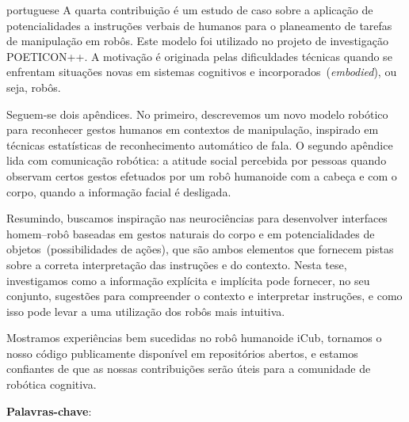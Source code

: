 \begin{otherlanguage*}{portuguese}
A quarta contribuição é um estudo de caso sobre a aplicação de potencialidades a instruções verbais de humanos para o planeamento de tarefas de manipulação em robôs.
Este modelo foi utilizado no projeto de investigação POETICON++.
A motivação é originada pelas dificuldades técnicas quando se enfrentam situações novas em sistemas cognitivos e incorporados~(\emph{embodied}), ou seja, robôs.

Seguem-se dois apêndices.
No primeiro, descrevemos um novo modelo robótico para reconhecer gestos humanos em contextos de manipulação, inspirado em técnicas estatísticas de reconhecimento automático de fala.
O segundo apêndice lida com comunicação robótica: a atitude social percebida por pessoas quando observam certos gestos efetuados por um robô humanoide com a cabeça e com o corpo, quando a informação facial é desligada.

\bigskip

Resumindo, buscamos inspiração nas neurociências para desenvolver interfaces homem--robô baseadas em gestos naturais do corpo e em potencialidades de objetos~(possibilidades de ações), que são ambos elementos que fornecem pistas sobre a correta interpretação das instruções e do contexto.
Nesta tese, investigamos como a informação explícita e implícita pode fornecer, no seu conjunto, sugestões para compreender o contexto e interpretar instruções, e como isso pode levar a uma utilização dos robôs mais intuitiva.

Mostramos experiências bem sucedidas no robô humanoide iCub, tornamos o nosso código publicamente disponível em repositórios abertos, e estamos confiantes de que as nossas contribuições serão úteis para a comunidade de robótica cognitiva.

\textbf{Palavras-chave}: \myPortugueseThesisKeywords
\end{otherlanguage*}
